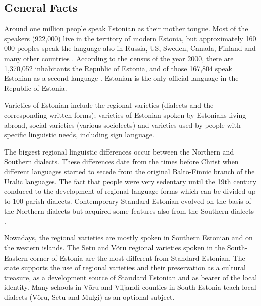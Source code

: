\clearpage


\begin{multicols}{2}

\subsection{General Facts}

Around one million people speak Estonian as their mother tongue. 
Most of the speakers (922,000) live in the territory of modern Estonia, but approximately 160 000 peoples speak the language also in Russia, US, Sweden, Canada, Finland and many other countries \cite{Stat1}.
According to the census of the year 2000, there are 1,370,052 inhabitants the Republic of Estonia, and of those 167,804 speak Estonian as a second language \cite{Stat2}. 
Estonian is the only official language in the Republic of Estonia.


Varieties of Estonian include the regional varieties (dialects and the corresponding written forms); varieties of Estonian spoken by Estonians living abroad, social varieties (various sociolects) and varieties used by people with specific linguistic needs, including sign language.

The biggest regional linguistic differences occur between the Northern and Southern dialects. 
These differences date from the times before Christ when different languages started to secede from the original Balto-Finnic branch of the Uralic languages. 
The fact that people were very sedentary until the 19th century conduced to the development of regional language forms which can be divided up to 100 parish dialects. 
Contemporary Standard Estonian evolved on the basis of the Northern dialects but acquired some features also from the Southern dialects \cite{KeeleStratEn}.

Nowadays, the regional varieties are mostly spoken in Southern Estonian and on the western islands. 
The Setu and Võru regional varieties spoken in the South-Eastern corner of Estonia are the most different from Standard Estonian. 
The state supports the use of regional varieties and their preservation as a cultural treasure, as a development source of Standard Estonian and as bearer of the local identity. 
Many schools in Võru and Viljandi counties in South Estonia teach local dialects (Võru, Setu and Mulgi) as an optional subject.


\end{multicols}
